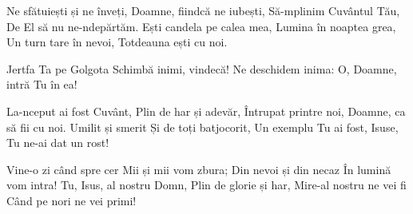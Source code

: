 \beginverse
Ne sfătuiești și ne înveți,
Doamne, fiindcă ne iubești,
Să-mplinim Cuvântul Tău,
De El să nu ne-ndepărtăm.
Ești candela pe calea mea,
Lumina în noaptea grea,
Un turn tare în nevoi,
Totdeauna ești cu noi.
\endverse

\beginchorus
Jertfa Ta pe Golgota
Schimbă inimi, vindecă!
Ne deschidem inima:
O, Doamne, intră Tu în ea!
\endchorus

\beginverse
La-nceput ai fost Cuvânt,
Plin de har și adevăr,
Întrupat printre noi,
Doamne, ca să fii cu noi.
Umilit și smerit
Și de toți batjocorit,
Un exemplu Tu ai fost,
Isuse, Tu ne-ai dat un rost!
\endverse

\beginverse
Vine-o zi când spre cer
Mii și mii vom zbura;
Din nevoi și din necaz
În lumină vom intra!
Tu, Isus, al nostru Domn,
Plin de glorie și har,
Mire-al nostru ne vei fi
Când pe nori ne vei primi!
\endverse
\endsong